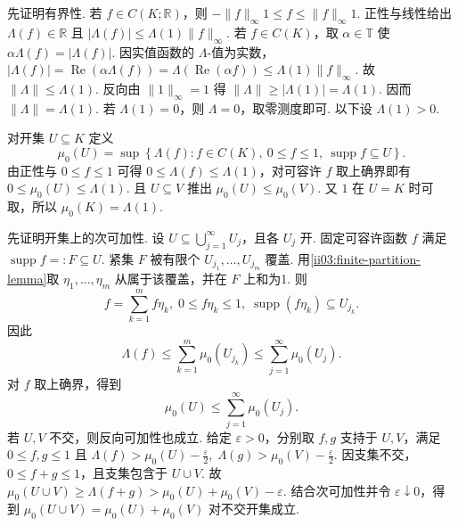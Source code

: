 \begin{FAProof}
先证明有界性. 若 \(\displaystyle f\in C(K;\mathbb R)\)，则
\(\displaystyle -\|f\|_\infty1\leqslant f\leqslant\|f\|_\infty1.\)
正性与线性给出 \(\displaystyle\Lambda(f)\in\mathbb R\) 且
\(\displaystyle |\Lambda(f)|\leqslant\Lambda(1)\|f\|_\infty.\)
若 \(\displaystyle f\in C(K)\)，取 \(\displaystyle\alpha\in\mathbb T\) 使 \(\displaystyle\alpha\Lambda(f)=|\Lambda(f)|\). 因实值函数的 \(\displaystyle\Lambda\)-值为实数，
\(\displaystyle |\Lambda(f)| =\operatorname{Re}(\alpha\Lambda(f)) =\Lambda(\operatorname{Re}(\alpha f)) \leqslant\Lambda(1)\|f\|_\infty.\)
故 \(\displaystyle\|\Lambda\|\leqslant\Lambda(1)\). 反向由 \(\displaystyle\|1\|_\infty=1\) 得 \(\displaystyle\|\Lambda\|\geqslant|\Lambda(1)|=\Lambda(1)\). 因而
\(\displaystyle \|\Lambda\|=\Lambda(1).\)
若 \(\displaystyle\Lambda(1)=0\)，则 \(\displaystyle\Lambda=0\)，取零测度即可. 以下设 \(\displaystyle\Lambda(1)>0\).

对开集 \(\displaystyle U\subseteq K\) 定义
\[
\mu_0(U)=
\sup\left\{
\Lambda(f):
 f\in C(K),\ 0\leqslant f\leqslant1,\ \operatorname{supp}f\subseteq U
\right\}.
\]
由正性与 \(\displaystyle0\leqslant f\leqslant1\) 可得 \(\displaystyle0\leqslant\Lambda(f)\leqslant\Lambda(1)\)，对可容许 \(\displaystyle f\) 取上确界即有 \(\displaystyle0\leqslant\mu_0(U)\leqslant\Lambda(1)\). 且 \(\displaystyle U\subseteq V\) 推出 \(\displaystyle\mu_0(U)\leqslant\mu_0(V)\). 又 \(\displaystyle1\) 在 \(\displaystyle U=K\) 时可取，所以 \(\displaystyle\mu_0(K)=\Lambda(1)\).

先证明开集上的次可加性. 设 \(\displaystyle U\subseteq\bigcup_{j=1}^{\infty}U_j\)，且各 \(\displaystyle U_j\) 开. 固定可容许函数 \(\displaystyle f\) 满足 \(\displaystyle\operatorname{supp}f=:F\subseteq U\). 紧集 \(\displaystyle F\) 被有限个 \(\displaystyle U_{j_1},\dots,U_{j_m}\) 覆盖. 用\autoref{ii03:finite-partition-lemma}取 \(\displaystyle\eta_1,\dots,\eta_m\) 从属于该覆盖，并在 \(\displaystyle F\) 上和为1. 则
\[
f=\sum_{k=1}^m f\eta_k,
\;
0\leqslant f\eta_k\leqslant1,
\;
\operatorname{supp}(f\eta_k)\subseteq U_{j_k}.
\]
因此
\[
\Lambda(f)
\leqslant\sum_{k=1}^m\mu_0(U_{j_k})
\leqslant\sum_{j=1}^{\infty}\mu_0(U_j).
\]
对 \(\displaystyle f\) 取上确界，得到
\[
\mu_0(U)\leqslant\sum_{j=1}^{\infty}\mu_0(U_j).
\]
若 \(\displaystyle U,V\) 不交，则反向可加性也成立. 给定 \(\displaystyle\varepsilon>0\)，分别取 \(\displaystyle f,g\) 支持于 \(\displaystyle U,V\)，满足 \(\displaystyle0\leqslant f,g\leqslant1\) 且
\(\displaystyle \Lambda(f)>\mu_0(U)-\frac\varepsilon2, \; \Lambda(g)>\mu_0(V)-\frac\varepsilon2.\)
因支集不交，\(\displaystyle0\leqslant f+g\leqslant1\)，且支集包含于 \(\displaystyle U\cup V\). 故
\(\displaystyle \mu_0(U\cup V) \geqslant\Lambda(f+g) >\mu_0(U)+\mu_0(V)-\varepsilon.\)
结合次可加性并令 \(\displaystyle\varepsilon\downarrow0\)，得到
\(\displaystyle \mu_0(U\cup V)=\mu_0(U)+\mu_0(V)\)
对不交开集成立.


\end{FAProof}

